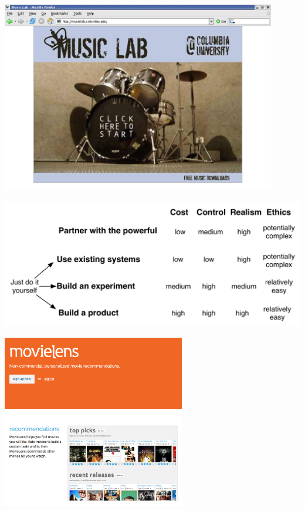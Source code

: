 \documentclass[aspectratio=169]{beamer}
\begin{document}
\begin{frame}

\begin{center}
\includegraphics[width=0.9\textwidth]{figures/splashscreen}
\end{center}

\end{frame}
\begin{frame}

\begin{center}
\includegraphics[width=\textwidth]{figures/exp_making_it_happen_slides_4}
\end{center}

\end{frame}
\begin{frame}

\begin{center}
\includegraphics[width=0.6\textwidth]{figures/movielens}
\end{center}

\end{frame}
\end{document}
